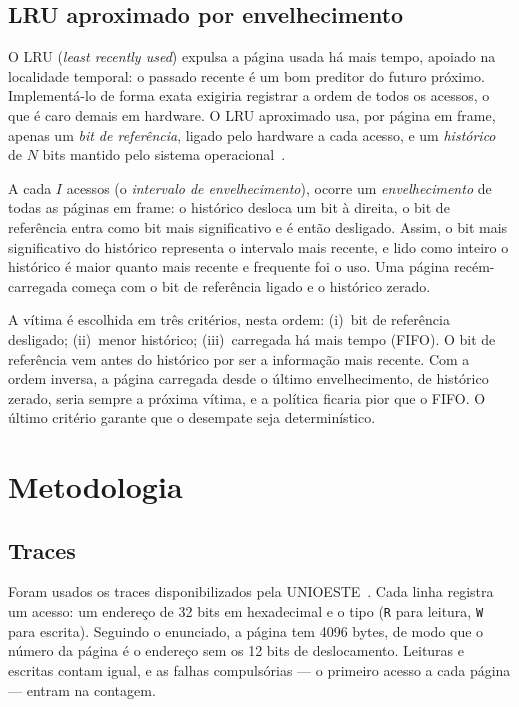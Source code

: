 \documentclass[12pt]{article}
\begin{document}
\subsection{LRU aproximado por envelhecimento}

O LRU (\emph{least recently used}) expulsa a página usada há mais tempo, apoiado
na localidade temporal: o passado recente é um bom preditor do futuro próximo.
Implementá-lo de forma exata exigiria registrar a ordem de todos os acessos, o
que é caro demais em hardware. O LRU aproximado usa, por página em frame, apenas
um \emph{bit de referência}, ligado pelo hardware a cada acesso, e um
\emph{histórico} de $N$ bits mantido pelo sistema
operacional~\cite{tanenbaum:15}.

A cada $I$ acessos (o \emph{intervalo de envelhecimento}), ocorre um
\emph{envelhecimento} de todas as páginas em frame: o histórico desloca um bit à
direita, o bit de referência entra como bit mais significativo e é então
desligado. Assim, o bit mais significativo do histórico representa o intervalo
mais recente, e lido como inteiro o histórico é maior quanto mais recente e
frequente foi o uso. Uma página recém-carregada começa com o bit de referência
ligado e o histórico zerado.

A vítima é escolhida em três critérios, nesta ordem: (i)~bit de referência
desligado; (ii)~menor histórico; (iii)~carregada há mais tempo (FIFO). O bit de
referência vem antes do histórico por ser a informação mais recente. Com a
ordem inversa, a página carregada desde o último envelhecimento, de histórico
zerado, seria sempre a próxima vítima, e a política ficaria pior que o FIFO. O
último critério garante que o desempate seja determinístico.

\section{Metodologia}\label{sec:metodologia}

\subsection{Traces}

Foram usados os traces disponibilizados pela UNIOESTE~\cite{traces:unioeste}.
Cada linha registra um acesso: um endereço de 32 bits em hexadecimal e o tipo
(\texttt{R} para leitura, \texttt{W} para escrita). Seguindo o enunciado, a
página tem 4096 bytes, de modo que o número da página é o endereço sem os 12
bits de deslocamento. Leituras e escritas contam igual, e as falhas
compulsórias --- o primeiro acesso a cada página --- entram na contagem.
\end{document}
